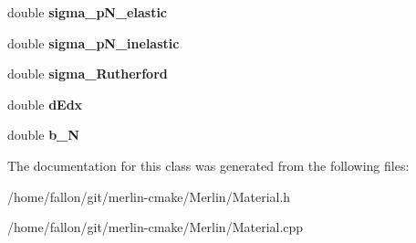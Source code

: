 \begin{DoxyCompactItemize}
double {\bfseries sigma\+\_\+p\+N\+\_\+elastic}
\item 
\mbox{\label{classMaterial_a59a263a9e3b1d113c1050a9997a0ae63}} 
double {\bfseries sigma\+\_\+p\+N\+\_\+inelastic}
\item 
\mbox{\label{classMaterial_a798c049ca8aef435661427a3c44c0523}} 
double {\bfseries sigma\+\_\+\+Rutherford}
\item 
\mbox{\label{classMaterial_af8323fb477b0eb4ff75af8c30bca3844}} 
double {\bfseries d\+Edx}
\item 
\mbox{\label{classMaterial_a510b1591d24edfb5654b230309d723b1}} 
double {\bfseries b\+\_\+N}
\end{DoxyCompactItemize}


The documentation for this class was generated from the following files\+:\begin{DoxyCompactItemize}
\item 
/home/fallon/git/merlin-\/cmake/\+Merlin/Material.\+h\item 
/home/fallon/git/merlin-\/cmake/\+Merlin/Material.\+cpp\end{DoxyCompactItemize}
